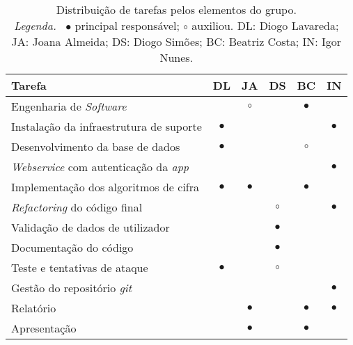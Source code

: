 \begin{table}[!htbp]
    \centering
    \begin{tabular}{l c c c c c}
        \toprule
        \textbf{Tarefa}                                      & \textbf{DL} & \textbf{JA} & \textbf{DS} & \textbf{BC} & \textbf{IN} \\
        \midrule
        Engenharia de \textit{Software}                      &             & $\circ$     &             & $\bullet$    &            \\
        Instalação da infraestrutura de suporte              & $\bullet$   &             &             &              & $\bullet$  \\
        Desenvolvimento da base de dados                     & $\bullet$   &             &             & $\circ$      &            \\
        \textit{Webservice} com autenticação da \textit{app} &             &             &             &              & $\bullet$  \\
        Implementação dos algoritmos de cifra                & $\bullet$   & $\bullet$   &             & $\bullet$    &            \\
        \textit{Refactoring} do código final                 &             &             & $\circ$     &              & $\bullet$  \\
        Validação de dados de utilizador                     &             &             & $\bullet$   &              &            \\
        Documentação do código                               &             &             & $\bullet$   &              &            \\
        Teste e tentativas de ataque                         & $\bullet$   &             & $\circ$     &              &            \\
        Gestão do repositório \textit{git}                   &             &             &             &              & $\bullet$  \\
        Relatório                                            &             & $\bullet$   &             & $\bullet$    & $\bullet$  \\
        Apresentação                                         &             & $\bullet$   &             & $\bullet$    &            \\
        \bottomrule
    \end{tabular}
    \caption[Distribuição de tarefas]{
        Distribuição de tarefas pelos elementos do grupo.\\
        \textit{Legenda.}~%
        $\bullet$ principal responsável; $\circ$ auxiliou.
        DL: Diogo Lavareda; JA: Joana Almeida; DS: Diogo Simões; BC: Beatriz Costa; IN: Igor Nunes.
    }
    \label{tab::divisao-trabalho}
\end{table}


